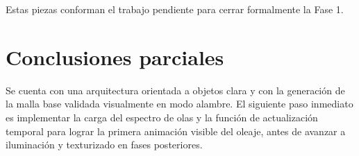 \documentclass[11pt]{article}
\begin{document}
Estas piezas conforman el trabajo pendiente para cerrar formalmente la Fase 1.

\section{Conclusiones parciales}

Se cuenta con una arquitectura orientada a objetos clara y con la generación de
la malla base validada visualmente en modo alambre. El siguiente paso inmediato
es implementar la carga del espectro de olas y la función de actualización
temporal para lograr la primera animación visible del oleaje, antes de avanzar
a iluminación y texturizado en fases posteriores.
\end{document}
